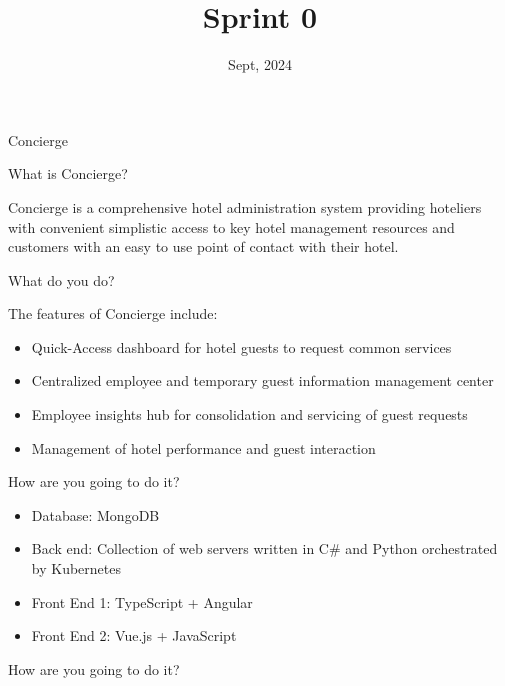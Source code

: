 \documentclass{beamer}
\title{Sprint 0}
\institute{COMP 4350}
\date{Sept, 2024}
\begin{document}
\frame{\titlepage}

\begin{frame}{Concierge}
\begin{figure}
    \centering
\end{figure}
\end{frame}
\begin{frame}{What is Concierge?}

    Concierge is a comprehensive hotel administration system providing hoteliers with convenient simplistic access to key hotel management resources and customers with an easy to use point of contact with their hotel. 

\end{frame}

\beamerdefaultoverlayspecification{<+->}

\begin{frame}{What do you do?}

    The features of Concierge include:
    \begin{itemize}
        \item Quick-Access dashboard for hotel guests to request common services
        \item Centralized employee and temporary guest information management center
        \item Employee insights hub for consolidation and servicing of guest requests
        \item Management of hotel performance and guest interaction
    \end{itemize}
\end{frame}

\begin{frame}{How are you going to do it?}
    \begin{itemize}
        \item Database: MongoDB
        \item Back end: Collection of web servers written in C\# and Python orchestrated by Kubernetes
        \item Front End 1: TypeScript + Angular
        \item Front End 2: Vue.js + JavaScript
    \end{itemize}
\end{frame}

\beamerdefaultoverlayspecification{<*>}

\begin{frame}{How are you going to do it?}
\end{frame}
\end{document}
